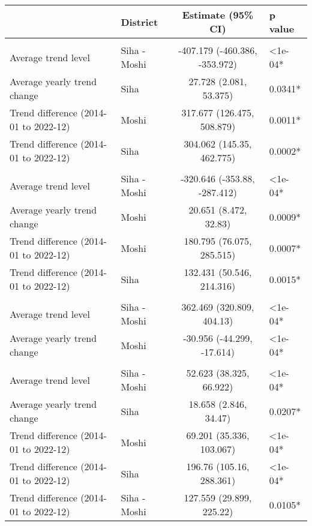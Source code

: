 \begingroup
\fontsize{12.0pt}{14.4pt}\selectfont
\begin{longtable}{l|lcl}
\toprule
 & District & Estimate (95\% CI) & p value \\ 
\midrule\addlinespace[2.5pt]
\multicolumn{4}{l}{Cardiovascular Diseases} \\[2.5pt] 
\midrule\addlinespace[2.5pt]
Average trend level & Siha - Moshi & -407.179 (-460.386, -353.972) & <1e-04* \\ 
Average yearly trend change & Siha & 27.728 (2.081, 53.375) & 0.0341* \\ 
Trend difference (2014-01 to 2022-12) & Moshi & 317.677 (126.475, 508.879) & 0.0011* \\ 
Trend difference (2014-01 to 2022-12) & Siha & 304.062 (145.35, 462.775) & 0.0002* \\ 
\midrule\addlinespace[2.5pt]
\multicolumn{4}{l}{Diabetes Mellitus} \\[2.5pt] 
\midrule\addlinespace[2.5pt]
Average trend level & Siha - Moshi & -320.646 (-353.88, -287.412) & <1e-04* \\ 
Average yearly trend change & Moshi & 20.651 (8.472, 32.83) & 0.0009* \\ 
Trend difference (2014-01 to 2022-12) & Moshi & 180.795 (76.075, 285.515) & 0.0007* \\ 
Trend difference (2014-01 to 2022-12) & Siha & 132.431 (50.546, 214.316) & 0.0015* \\ 
\midrule\addlinespace[2.5pt]
\multicolumn{4}{l}{Gastrointestinal Infections} \\[2.5pt] 
\midrule\addlinespace[2.5pt]
Average trend level & Siha - Moshi & 362.469 (320.809, 404.13) & <1e-04* \\ 
Average yearly trend change & Moshi & -30.956 (-44.299, -17.614) & <1e-04* \\ 
\midrule\addlinespace[2.5pt]
\multicolumn{4}{l}{Infectious Eye Disease} \\[2.5pt] 
\midrule\addlinespace[2.5pt]
Average trend level & Siha - Moshi & 52.623 (38.325, 66.922) & <1e-04* \\ 
Average yearly trend change & Siha & 18.658 (2.846, 34.47) & 0.0207* \\ 
Trend difference (2014-01 to 2022-12) & Moshi & 69.201 (35.336, 103.067) & <1e-04* \\ 
Trend difference (2014-01 to 2022-12) & Siha & 196.76 (105.16, 288.361) & <1e-04* \\ 
Trend difference (2014-01 to 2022-12) & Siha - Moshi & 127.559 (29.899, 225.22) & 0.0105* \\ 

\end{longtable}
